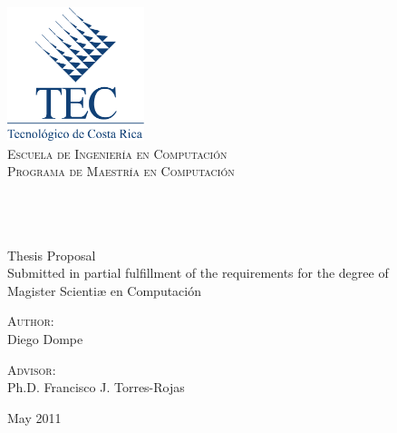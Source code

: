 \begin{titlepage}

\begin{center}

\includegraphics[width=0.3\textwidth]{../Common/Images/logoTec}
\\[0.2cm]
\textcolor{tecblue}{%
\textsc{\LARGE Escuela de Ingeniería en Computación}\\[0.2cm]
\textsc{\large Programa de Maestría en Computación}\\
 }
 \vfill
 
\HRule 
\\[0.9cm]
\doublespacing
{ \huge \bfseries \thesistitle}
\\[0.4cm]
\singlespacing
\HRule 
\\[1.4cm]

{\large Thesis Proposal\\
Submitted in partial fulfillment of the requirements for the degree of\\[0.6cm]
Magister Scientiæ en Computación}
\\
\vfill
 
\begin{minipage}{0.45\textwidth}
\begin{flushleft} \large
\textsc{Author:}\\
{Diego Dompe}
\end{flushleft}
\end{minipage}
\begin{minipage}{0.45\textwidth}
\begin{flushright} \large
\textsc{Advisor:}\\
{Ph.D. Francisco J. Torres-Rojas}
\end{flushright}
\end{minipage}
 
 
\vfill
 
{\large May 2011}
 \end{center}
 \end{titlepage}
